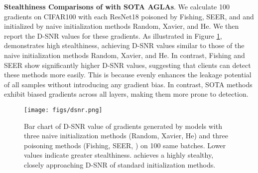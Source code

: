 \textbf{Stealthiness Comparisons of \name with SOTA AGLAs}.
We calculate 100 gradients on CIFAR100 with each ResNet18 poisoned by Fishing, SEER, and \name and initialized by naive initialization methods Random, Xavier, and He. We then report the D-SNR values for these gradients. As illustrated in Figure \ref{dsnridsnr}, \name demonstrates high stealthiness, achieving D-SNR values similar to those of the naive initialization methods Random, Xavier, and He. In contrast, Fishing and SEER show significantly higher D-SNR values, suggesting that clients can detect these methods more easily. This is because \name evenly enhances the leakage potential of all samples without introducing any gradient bias. In contrast, SOTA methods exhibit biased gradients across all layers, making them more prone to detection.
\begin{figure}[t]
    \centering
    \vspace{0.0cm}  %
    \texttt{[image: figs/dsnr.png]}
    \caption{Bar chart of D-SNR value of gradients generated by models with three naive initialization methods (Random, Xavier, He) and three poisoning methods (Fishing, SEER, \name) on 100 same batches. Lower values indicate greater stealthiness. \name achieves a highly stealthy, closely approaching D-SNR of standard initialization methods.}
    \label{dsnridsnr}
    \vspace{-0.3cm}
\end{figure}

